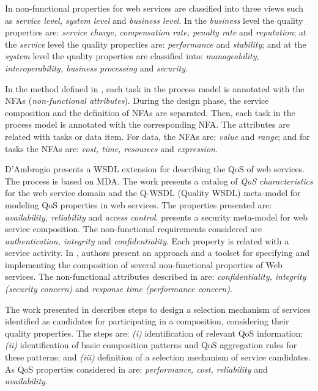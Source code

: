 In \cite{Babamir2010,Yeom2006} non-functional properties for web services
are classified into three views such as
\textit{service level, system level} and \textit{business level}.
In the \textit{\textit{business}} level the quality properties are:
\textit{service charge, compensation rate, penalty rate} and
\textit{reputation}; at the \textit{\textit{service}} level the quality
properties are: \textit{performance} and \textit{stability}; and at the
\textit{system} level the quality properties are classified into:
\textit{manageability, interoperability, business processing} and
\textit{security}.

In the method defined in \cite{XiaoCZBOLH08}, each task in the process model is
annotated with the NFAs (\textit{non-functional attributes}). During the design phase, the
service composition and the definition of NFAs are separated. Then,
each task in the process model is annotated with the corresponding NFA. The
attributes are related with tasks or data item. For data, the NFAs are:
\textit{value} and \textit{range}; and for tasks the NFAs are: \textit{cost,
time, resources} and \textit{expression}.

D'Ambrogio \cite{DAmbrogio06} presents a WSDL extension for describing the QoS
of web services. The process is based on MDA. The work presents a catalog
of \textit{QoS characteristics} for the web service domain and the Q-WSDL
(Quality WSDL) meta-model for modeling QoS properties in web services. The properties
presented are: \textit{availability, reliability} and \textit{access
control}. \cite{CholletL09} presents a security meta-model for web service
composition. The non-functional requirements considered are
\textit{authentication, integrity} and \textit{confidentiality}. Each property is related with a service activity. In \cite{SchmelingCM11}, authors
present an approach and a toolset for specifying and implementing the
composition of several non-functional properties of Web services. The
non-functional attributes described in \cite{SchmelingCM11} are: \textit{confidentiality, integrity
(security concern)} and \textit{response time (performance concern)}.

The work presented in \cite{ThissenW06} describes
steps to design a selection mechanism of services identified as candidates for
participating in a composition, considering their quality properties. The steps
are: \textit{(i)} identification of relevant QoS information; \textit{(ii)} identification of basic composition patterns and
QoS aggregation rules for these patterns; and \textit{(iii)} definition of a
selection mechanism of service candidates. As QoS properties considered in
\cite{ThissenW06} are: \textit{performance, cost, reliability} and
\textit{availability}. 
  

